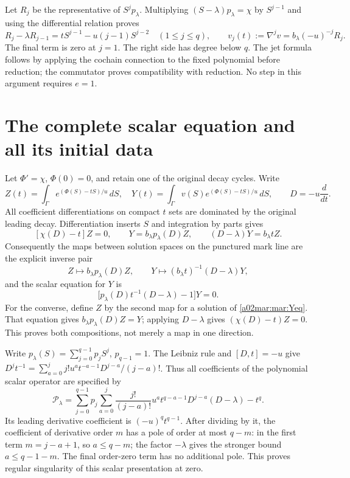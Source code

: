 \documentclass[11pt,a4paper]{article}
\begin{document}
Let $R_j$ be the representative of $S^jp_\lambda$. Multiplying
$(S-\lambda)p_\lambda=\chi$ by $S^{j-1}$ and using the differential
relation proves
\begin{equation}\tag{MAR3}\label{a02mar:mar:rec}
 R_j-\lambda R_{j-1}=tS^{j-1}-u(j-1)S^{j-2}\quad(1\le j\le q),
 \qquad v_j(t):=\nabla^jv=b_\lambda(-u)^{-j}R_j.
\end{equation}
The final term is zero at $j=1$. The right side has degree below $q$.
The jet formula follows by applying the cochain connection to the fixed
polynomial before reduction; the commutator proves compatibility with
reduction. No step in this argument requires $e=1$.

\section{The complete scalar equation and all its initial data}
Let $\Phi'=\chi$, $\Phi(0)=0$, and retain one of the original decay
cycles. Write
\[
 Z(t)=\int_\Gamma e^{(\Phi(S)-tS)/u}\,dS,\quad
 Y(t)=\int_\Gamma v(S)e^{(\Phi(S)-tS)/u}\,dS,
 \qquad D=-u\frac{d}{dt}.
\]
All coefficient differentiations on compact $t$ sets are dominated by
the original leading decay. Differentiation inserts $S$ and integration
by parts gives
\begin{equation}\tag{MAR4}\label{a02mar:mar:scalar-maps}
 [\chi(D)-t]Z=0,\qquad
 Y=b_\lambda p_\lambda(D)Z,\qquad
 (D-\lambda)Y=b_\lambda t Z.
\end{equation}
Consequently the maps between solution spaces on the punctured mark line
are the explicit inverse pair
\begin{equation}\tag{MAR5}\label{a02mar:mar:inverse-solutions}
 Z\longmapsto b_\lambda p_\lambda(D)Z,
 \qquad Y\longmapsto (b_\lambda t)^{-1}(D-\lambda)Y,
\end{equation}
and the scalar equation for $Y$ is
\begin{equation}\tag{MAR6}\label{a02mar:mar:Yeq}
 \bigl[p_\lambda(D)t^{-1}(D-\lambda)-1\bigr]Y=0.
\end{equation}
For the converse, define $Z$ by the second map for a solution of
\eqref{a02mar:mar:Yeq}. That equation gives $b_\lambda p_\lambda(D)Z=Y$;
applying $D-\lambda$ gives $(\chi(D)-t)Z=0$. This proves both
compositions, not merely a map in one direction.

Write $p_\lambda(S)=\sum_{j=0}^{q-1}p_jS^j$, $p_{q-1}=1$.
The Leibniz rule and $[D,t]=-u$ give
$D^jt^{-1}=\sum_{a=0}^j j!u^a t^{-a-1}D^{j-a}/(j-a)!$.
Thus all coefficients of the polynomial scalar operator are specified by
\begin{equation}\tag{MAR7}\label{a02mar:mar:P}
 \mathscr P_\lambda=
 \sum_{j=0}^{q-1}p_j\sum_{a=0}^j
 \frac{j!}{(j-a)!}u^a t^{q-a-1}D^{j-a}(D-\lambda)-t^q.
\end{equation}
Its leading derivative coefficient is $(-u)^q t^{q-1}$.
After dividing by it, the coefficient of derivative order $m$ has
a pole of order at most $q-m$: in the first term $m=j-a+1$,
so $a\le q-m$; the factor $-\lambda$ gives the stronger bound
$a\le q-1-m$. The final order-zero term has no additional pole.
This proves regular singularity of this scalar presentation at zero.
\end{document}
